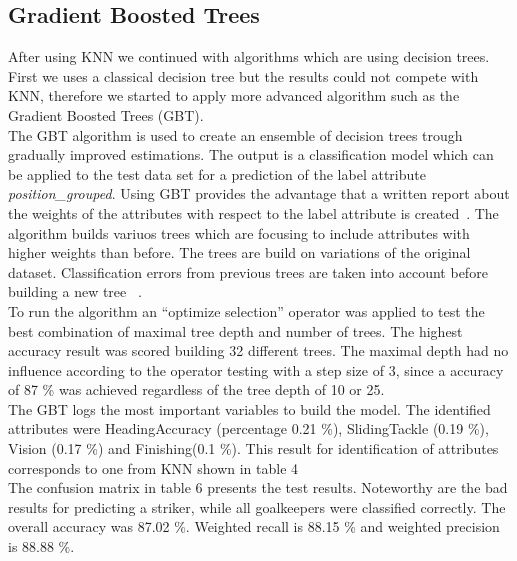 \subsection{Gradient Boosted Trees}
After using KNN we continued with algorithms which are using decision trees. First we uses a classical decision tree but the results could not compete with KNN, therefore we started to apply more advanced algorithm such as the Gradient Boosted Trees (GBT).\\
The GBT algorithm is used to create an ensemble of decision trees trough gradually improved estimations. The output is a classification model which can be applied to the test data set for a prediction of the label attribute\textit{ position\_grouped}. Using GBT provides the advantage that a written report about the weights of the attributes with respect to the label attribute is created~\cite{ref_rapidminergbt}. The algorithm builds variuos trees which are focusing to include attributes with higher weights than before. The trees are build on variations of the original dataset. Classification errors from previous trees are taken into account before building a new tree ~\cite{ref_towardsGBT}.\\
To run the algorithm an ``optimize selection'' operator was applied to test the best combination of maximal tree depth and number of trees.  The highest accuracy result was scored building 32 different trees. The maximal depth had no influence according to the operator testing with a step size of 3, since a accuracy of 87 \% was achieved regardless of the tree depth of 10 or 25.\\
The GBT logs the most important variables to build the model. The identified attributes were HeadingAccuracy (percentage 0.21 \%), SlidingTackle (0.19 \%), Vision (0.17 \%) and Finishing(0.1 \%). This result for identification of attributes corresponds to one from KNN shown in table 4\\
The confusion matrix in table 6 presents the test results. Noteworthy are the bad results for predicting a striker, while all goalkeepers were classified correctly. The overall accuracy was 87.02 \%. Weighted recall is 88.15 \% and weighted precision is 88.88 \%. \\

